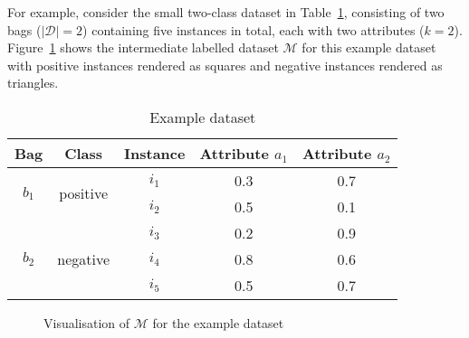 \documentclass[a4paper,12pt]{report} %
\newcommand{\mcl}[1]{\mathcal{#1}}
\begin{document}
For example, consider the small two-class dataset in Table~\ref{tEgData}, 
    consisting of two bags ($|\mcl{D}| = 2$)
    containing five instances in total, each with two attributes ($k=2$).
Figure~\ref{visM} shows the intermediate labelled dataset $\mcl{M}$ 
    for this example dataset with 
    positive instances rendered as squares and 
    negative instances rendered as triangles.

\begin{table}[p]
\begin{center}
\begin{tabular}{ccccc}
    \toprule
    Bag & Class & Instance & Attribute $a_1$ & Attribute $a_2$ \\
    \midrule
    \multirow{2}{*}{$b_1$} & \multirow{2}{*}{positive} & $i_1$ & 0.3 & 0.7 \\
    &  & $i_2$ & 0.5 & 0.1 \\
    \cmidrule(r){1-5}
    \multirow{3}{*}{$b_2$} & \multirow{3}{*}{negative} & $i_3$ & 0.2 & 0.9 \\
    & & $i_4$ & 0.8 & 0.6 \\
    & & $i_5$ & 0.5 & 0.7 \\
    \bottomrule
    
\end{tabular}
\end{center}
\caption{Example dataset}
\label{tEgData}
\end{table}

\begin{figure}[p]
\begin{center}
\iftoggle{dotikzext}{\tikzsetnextfilename{eg-data/d1}}{}
\end{center}
\caption{Visualisation of $\mcl{M}$ for the example dataset}
\label{visM}
\end{figure}
\end{document}
